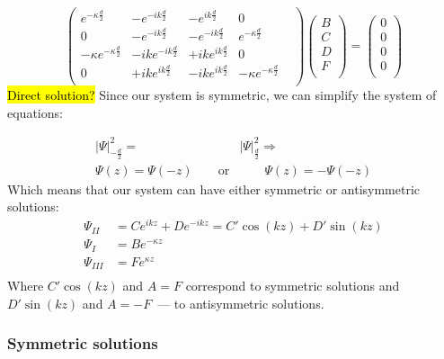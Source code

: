 		\begin{equation}
			\begin{pmatrix}
			e^{-\kappa\frac{d}{2}}			&	-e^{-ik\frac{d}{2}}	&	-e^{ik\frac{d}{2}}	&	0 \\ 
			0	&	-e^{-ik\frac{d}{2}}	&	-e^{-ik\frac{d}{2}}	&	e^{-\kappa \frac{d}{2}} \\
			-\kappa e^{-\kappa \frac{d}{2}}	& -ike^{-ik\frac{d}{2}}	& +ike^{ik\frac{d}{2}}	& 0 \\
			0	& +ike^{ik\frac{d}{2}}	& -ike^{ik\frac{d}{2}}	& 	-\kappa e^{-\kappa\frac{d}{2}}	& \\
			\end{pmatrix}
			\begin{pmatrix}
			B \\
			C \\
			D \\
			F \\
			\end{pmatrix}
			=
			\begin{pmatrix}
			0 \\
			0 \\
			0 \\
			0 \\
			\end{pmatrix}			
		\end{equation}
		\hl{Direct solution?}
		Since our system is symmetric, we can simplify the system of equations:
		
		\begin{align}
			|\Psi|^2_{-\frac{d}{2}} =& |\Psi|^2_{\frac{d}{2}} \Rightarrow\\
			\Psi(z) = \Psi(-z) \qquad\text{or}&\qquad \Psi(z) = -\Psi(-z)
		\end{align}
		Which means that our system can have either symmetric or antisymmetric solutions:
		\begin{align}
			\Psi_{II}& = C e^{ikz} + D e^{-ikz} = C' \cos(kz) + D' \sin(kz) \\
			\Psi_{I}& = B e^{-\kappa z} \\
			\Psi_{III}& = F e^{\kappa z} \\		
		\end{align}
		Where $C'\cos(kz)$ and $A=F$ correspond to symmetric solutions and $D' \sin(kz)$ and $A = -F$~--- to antisymmetric solutions.
		
		\subsubsection{Symmetric solutions}
		
